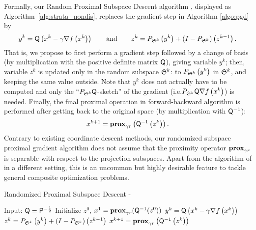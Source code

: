 Formally, our Random Proximal Subspace Descent algorithm \algo, displayed as Algorithm~\ref{alg:strata_nondis}, replaces the gradient step in Algorithm \ref{algo:pgd} by 
\begin{equation}\label{eq:grad_step}
    y^k = {\mathsf{Q}}\left(x^k - \gamma\nabla f\left(x^k\right)\right)\qquad\text{and}\qquad
    z^{k} = P_{\mathfrak{S}^k} \left(y^k\right) + (I- P_{\mathfrak{S}^k} ) \left(z^{k-1}\right).
\end{equation}
That is, we propose to first perform a gradient step followed by a change of basis {(by multiplication with the positive definite matrix ${\mathsf{Q}}$), giving variable $y^k$}; then, variable $z^k$ is updated only in the random subspace $\mathfrak{S}^k$: to  $P_{\mathfrak{S}^k} \left(y^k\right)$ in $\mathfrak{S}^k$, and keeping the same value outside. Note that $y^k$ does not actually have to be computed and only the ``$P_{\mathfrak{S}^k}{\mathsf{Q}}$-sketch'' of the gradient (i.e.\;$ P_{\mathfrak{S}^k}{\mathsf{Q}}\nabla f\left(x^k\right)$) is needed. Finally, the final proximal operation in forward-backward algorithm is performed {after getting back to the original space (by multiplication with ${\mathsf{Q}}^{-1}$)}:
\begin{align}\label{eq:prox_step}
   x^{k+1} = \mathbf{prox}_{\gamma r} \left({\mathsf{Q}}^{-1}\left(z^{k}\right)\right).
\end{align}
Contrary to existing coordinate descent methods, our randomized subspace proximal gradient algorithm does not assume that the proximity operator $\mathbf{prox}_{\gamma r} $ is separable with respect to the projection subspaces. Apart from the algorithm of \cite{hanzely2018sega} in a different setting, this is an uncommon but highly desirable feature to tackle general composite optimization problems.  

\begin{algorithm} %
\caption{Randomized Proximal Subspace Descent - \algo}
\label{alg:strata_nondis} %
\begin{algorithmic}[1] %
    \STATE Input:  ${\mathsf{Q}} = {\mathsf{P}}^{-\frac12}$
    \STATE Initialize $z^0$, $x^1 = \mathbf{prox}_{\gamma r}({\mathsf{Q}}^{-1}(z^0))$
            \STATE $y^k = {\mathsf{Q}}\left(x^k - \gamma\nabla f\left(x^k\right)\right)$
            \STATE $z^{k} = P_{\mathfrak{S}^k} \left(y^k\right) + (I- P_{\mathfrak{S}^k} ) \left(z^{k-1}\right)$
            \STATE$x^{k+1} = \mathbf{prox}_{\gamma r} \left({\mathsf{Q}}^{-1}\left(z^{k}\right)\right)$
    \ENDFOR
\end{algorithmic}
\end{algorithm}

